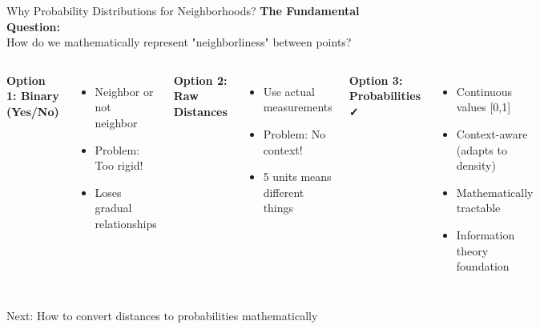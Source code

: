 \documentclass[aspectratio=169]{beamer}
\begin{document}
\begin{frame}{Why Probability Distributions for Neighborhoods?}
\textbf{The Fundamental Question:}\\
How do we mathematically represent "neighborliness" between points?

\begin{columns}
\textbf{Option 1: Binary (Yes/No)}
\begin{itemize}
\item Neighbor or not neighbor
\item Problem: Too rigid!
\item Loses gradual relationships
\end{itemize}

\textbf{Option 2: Raw Distances}
\begin{itemize}
\item Use actual measurements
\item Problem: No context!
\item 5 units means different things
\end{itemize}

\textbf{Option 3: Probabilities ✓}
\begin{itemize}
\item Continuous values [0,1]
\item Context-aware (adapts to density)
\item Mathematically tractable
\item Information theory foundation
\end{itemize}

\begin{center}
\end{center}
\end{columns}

\vspace{0.3cm}
\colorbox{green!20}{Next: How to convert distances to probabilities mathematically}
\end{frame}
\end{document}
